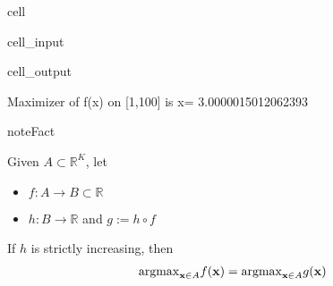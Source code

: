 \documentclass[letterpaper,10pt,english]{jupyterBook}
\begin{document}
\begin{sphinxuseclass}{cell}\begin{sphinxVerbatimInput}

\begin{sphinxuseclass}{cell_input}
\begin{sphinxVerbatim}[commandchars=\\\{\}]
   
   

        
     
   
\end{sphinxVerbatim}

\end{sphinxuseclass}\end{sphinxVerbatimInput}
\begin{sphinxVerbatimOutput}

\begin{sphinxuseclass}{cell_output}
\begin{sphinxVerbatim}[commandchars=\\\{\}]
Maximizer of f(x) on [1,100] is x= 3.0000015012062393
\end{sphinxVerbatim}

\end{sphinxuseclass}\end{sphinxVerbatimOutput}

\end{sphinxuseclass}
\begin{sphinxadmonition}{note}{Fact}

\sphinxAtStartPar
Given \(A \subset \mathbb{R}^K\), let
\begin{itemize}
\item {} 
\sphinxAtStartPar
\(f \colon A \to B \subset \mathbb{R}\)

\item {} 
\sphinxAtStartPar
\(h \colon B \to \mathbb{R}\) and \(g := h \circ f\)

\end{itemize}

\sphinxAtStartPar
If \(h\) is strictly increasing, then
\begin{equation*}
\begin{split}\mathrm{argmax}_{{\bf x} \in A}f({\bf x}) =\mathrm{argmax}_{{\bf x} \in A}g({\bf x})\end{split}
\end{equation*}\end{sphinxadmonition}
\end{document}
